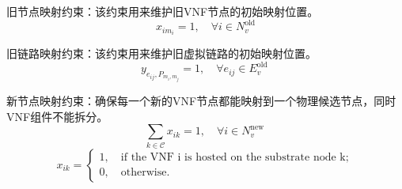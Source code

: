 旧节点映射约束：该约束用来维护旧VNF节点的初始映射位置。
\begin{equation}
    x_{i m_{i}}=1,\quad \forall i \in N_{v}^{\text {old}}
\end{equation}\par
旧链路映射约束：该约束用来维护旧虚拟链路的初始映射位置。
\begin{equation}
    y_{e_{i j}, P_{m_{i}, m_{j}}}=1,\quad \forall e_{i j} \in E_{v}^{\text {old }} 
\end{equation}\par
新节点映射约束：确保每一个新的VNF节点都能映射到一个物理候选节点，同时VNF组件不能拆分。
\begin{equation}
    \sum_{k \in \mathcal{C}} x_{i k}=1,\quad \forall i \in N_{v}^{\text {new }}
\end{equation}
\begin{equation}
    x_{ik}= \begin{cases}
        1,\quad \text{if the VNF i is hosted on the substrate node k}; \\
        0,\quad \text{otherwise}.
    \end{cases}
\end{equation}\par

